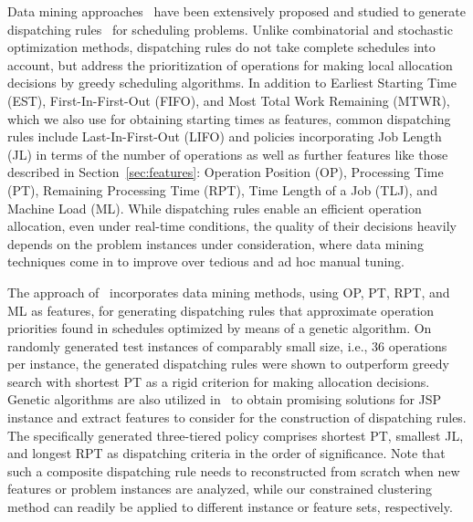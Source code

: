 \documentclass[runningheads]{llncs}
\begin{document}
Data mining approaches~\cite{ismail2012production} have been extensively proposed and studied to generate %
dispatching rules~\cite{blackstone1982state} for scheduling problems.
Unlike combinatorial and stochastic optimization methods, dispatching rules do not take
complete schedules into account, but address the prioritization of operations for making
local allocation decisions by greedy scheduling algorithms.
In addition to Earliest Starting Time (EST), First-In-First-Out (FIFO), and
Most Total Work Remaining (MTWR), which we also use for obtaining starting times as features,
common dispatching rules include Last-In-First-Out (LIFO) and policies incorporating
Job Length (JL) in terms of the number of operations as well as further features
like those described in Section~\ref{sec:features}:
Operation Position (OP), Processing Time (PT), Remaining Processing Time (RPT), 
Time Length of a Job (TLJ), and Machine Load (ML).
While dispatching rules enable an efficient operation allocation,
even under real-time conditions, the quality of their decisions heavily depends on the
problem instances under consideration, where data mining techniques come in to
improve over tedious and ad hoc manual tuning.

The approach of~\cite{koonce2000using} incorporates data mining methods,
using OP, PT, RPT, and ML as features, for generating dispatching rules that approximate
operation priorities found in schedules optimized by means of a genetic algorithm.
On randomly generated test instances of comparably small size, i.e., $36$ operations
per instance, the generated dispatching rules were shown to outperform greedy search
with shortest PT as a rigid criterion for making allocation decisions.
Genetic algorithms are also utilized in~\cite{harrath2002genetic} to obtain
promising solutions for JSP instance and extract features to consider for the
construction of dispatching rules.
The specifically generated three-tiered policy comprises shortest PT, smallest JL, and longest RPT as
dispatching criteria in the order of significance.
Note that such a composite dispatching rule needs to reconstructed from scratch when
new features or problem instances are analyzed, while our constrained clustering method
can readily be applied to different instance or feature sets, respectively.
\end{document}

